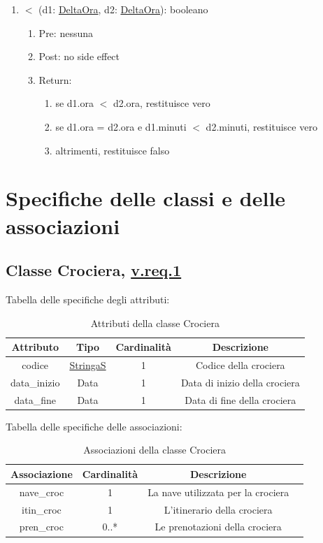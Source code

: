\documentclass{article}
\begin{document}
\begin{enumerate}
    \item $<$ (d1: \hyperref[sec:DeltaOra]{DeltaOra}, d2: \hyperref[sec:DeltaOra]{DeltaOra}): booleano
    \begin{enumerate}
        \item Pre: nessuna
        \item Post: no side effect
        \item Return:
        \begin{enumerate}
            \item se d1.ora $<$ d2.ora, restituisce vero
            \item se d1.ora = d2.ora e d1.minuti $<$ d2.minuti, restituisce vero
            \item altrimenti, restituisce falso
        \end{enumerate}
    \end{enumerate}
\end{enumerate}

\newpage
\section{Specifiche delle classi e delle associazioni}
\subsection*{Classe Crociera, \hyperref[sec:RequisitiCrociera]{v.req.1}}\label{sec:Crociera}
Tabella delle specifiche degli attributi:
\begin{table}[h!]
    \centering
    \begin{tabular}{|c|c|c|c|}
        \hline
        Attributo & Tipo & Cardinalità & Descrizione \\
        \hline
        codice & \hyperref[sec:StringaS]{StringaS} & 1 & Codice della crociera \\
        data\_inizio & Data & 1 & Data di inizio della crociera \\
        data\_fine & Data & 1 & Data di fine della crociera \\
        \hline
    \end{tabular}
    \caption{Attributi della classe Crociera}
\end{table}

Tabella delle specifiche delle associazioni:
\begin{table}[h!]
    \centering
    \begin{tabular}{|c|c|c|c|}
        \hline
        Associazione & Cardinalità & Descrizione \\
        \hline
        nave\_croc & 1 & La nave utilizzata per la crociera \\
        itin\_croc & 1 & L'itinerario della crociera \\
        pren\_croc & 0..* & Le prenotazioni della crociera \\
        \hline
    \end{tabular}
    \caption{Associazioni della classe Crociera}
\end{table}
\end{document}
